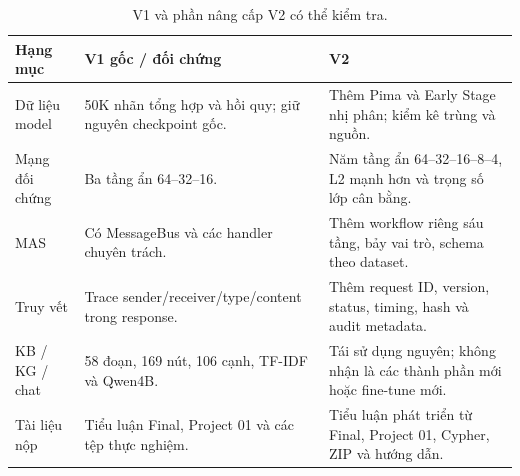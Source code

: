 \par\FloatBarrier\begin{table}[H]\centering\small{}\setlength{\tabcolsep}{5pt}
\caption{V1 và phần nâng cấp V2 có thể kiểm tra.}\begin{tabular}{P{2.6cm}P{5.6cm}P{5.6cm}}\toprule
Hạng mục & V1 gốc / đối chứng & V2\\\midrule
Dữ liệu model & 50K nhãn tổng hợp và hồi quy; giữ nguyên checkpoint gốc. & Thêm Pima và Early Stage nhị phân; kiểm kê trùng và nguồn.\\
Mạng đối chứng & Ba tầng ẩn 64--32--16. & Năm tầng ẩn 64--32--16--8--4, L2 mạnh hơn và trọng số lớp cân bằng.\\
MAS & Có MessageBus và các handler chuyên trách. & Thêm workflow riêng sáu tầng, bảy vai trò, schema theo dataset.\\
Truy vết & Trace sender/receiver/type/content trong response. & Thêm request ID, version, status, timing, hash và audit metadata.\\
KB / KG / chat & 58 đoạn, 169 nút, 106 cạnh, TF-IDF và Qwen4B. & Tái sử dụng nguyên; không nhận là các thành phần mới hoặc fine-tune mới.\\
Tài liệu nộp & Tiểu luận Final, Project 01 và các tệp thực nghiệm. & Tiểu luận phát triển từ Final, Project 01, Cypher, ZIP và hướng dẫn.\\\bottomrule\end{tabular}\end{table}
